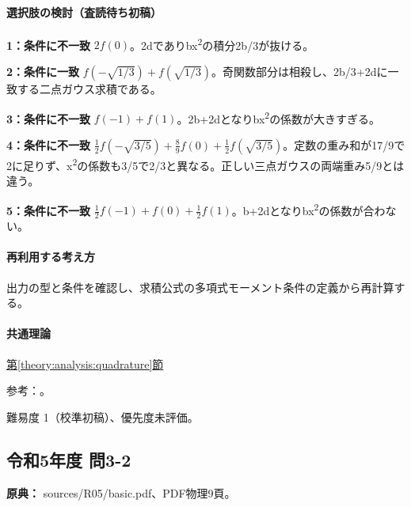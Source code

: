 \paragraph{選択肢の検討（査読待ち初稿）}\mbox{}\par

\noindent\textbf{1：条件に不一致} \(2f(0)\)。2dでありbx\textsuperscript{2}の積分2b/3が抜ける。\par

\noindent\textbf{2：条件に一致} \(f(-\sqrt{1/3})+f(\sqrt{1/3})\)。奇関数部分は相殺し、2b/3+2dに一致する二点ガウス求積である。\par

\noindent\textbf{3：条件に不一致} \(f(-1)+f(1)\)。2b+2dとなりbx\textsuperscript{2}の係数が大きすぎる。\par

\noindent\textbf{4：条件に不一致} \(\frac12f(-\sqrt{3/5})+\frac89f(0)+\frac12f(\sqrt{3/5})\)。定数の重み和が17/9で2に足りず、x\textsuperscript{2}の係数も3/5で2/3と異なる。正しい三点ガウスの両端重み5/9とは違う。\par

\noindent\textbf{5：条件に不一致} \(\frac12f(-1)+f(0)+\frac12f(1)\)。b+2dとなりbx\textsuperscript{2}の係数が合わない。\par

\paragraph{再利用する考え方} 出力の型と条件を確認し、求積公式の多項式モーメント条件の定義から再計算する。

\paragraph{共通理論} \hyperref[theory:analysis:quadrature]{第\ref*{theory:analysis:quadrature}節}

\par 参考：\cite{nist_quadrature}。

\par 難易度 1（校準初稿）、優先度未評価。

\subsection{令和5年度 問3-2}
\label{q:r05-reg-basic-3-2}

\noindent\textbf{原典：} sources/R05/basic.pdf、PDF物理9頁。

